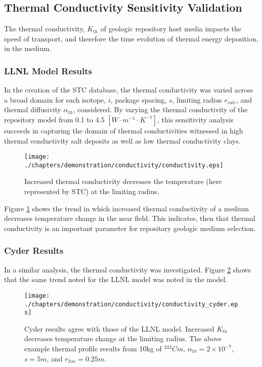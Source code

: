 \subsection{Thermal Conductivity Sensitivity Validation}\label{sec:conductivity}
The thermal conductivity, $K_{th}$ of geologic repository host media impacts 
the speed of transport, and therefore the time evolution of thermal energy 
deposition, in the medium. 

\FloatBarrier
\subsubsection{LLNL Model Results}
In the creation of the \gls{STC} database, the thermal conductivity was varied 
across a broad domain for each isotope, $i$, package spacing, $s$, limiting 
radius $r_{calc}$, and thermal diffusivity $\alpha_{th}$, considered.  By 
varying the thermal conductivity of the repository model from 0.1 to 4.5
$[W\cdot m^{-1} \cdot K^{-1}]$, this sensitivity analysis succeeds in capturing the domain of 
thermal conductivities witnessed in high thermal conductivity salt deposits as 
well as low thermal conductivity clays.

  \begin{figure}[htbp!]
    \begin{center}
      \texttt{[image: ./chapters/demonstration/conductivity/conductivity.eps]}
    \end{center}
    \caption[$K_{th}$ Sensitivity in LLNL Model]{Increased thermal conductivity 
      decreases the temperature (here represented by STC) at the limiting 
    radius.}
    \label{fig:Cm242Kth_alpha_low}
  \end{figure}

Figure \ref{fig:Cm242Kth_alpha_low} shows the trend in which increased thermal 
conductivity of a medium decreases temperature change 
in the near field. This indicates, then that thermal conductivity is 
an important parameter for repository geologic medium selection. 

\FloatBarrier
\subsubsection{Cyder Results}
In a similar analysis, the thermal conductivity was investigated. Figure 
\ref{fig:conductivity_cyder} shows that the same trend noted for the LLNL model 
was noted in the 
\Cyder model.

  \begin{figure}[htbp!]
    \begin{center}
      \texttt{[image: ./chapters/demonstration/conductivity/conductivity\_cyder.eps]}
    \end{center}
    \caption[$K_{th}$ Sensitivity in Cyder]
    {Cyder results agree with those of the LLNL model. Increased $K_{th}$ 
    decreases 
    temperature change at the limiting radius. The above example thermal 
    profile results from 10kg of $^{242}Cm$, $\alpha_{th}=2\times 10^{-7}$, 
    $s=5m$, 
    and $r_{lim}=0.25m$.}
    \label{fig:conductivity_cyder}
  \end{figure}


